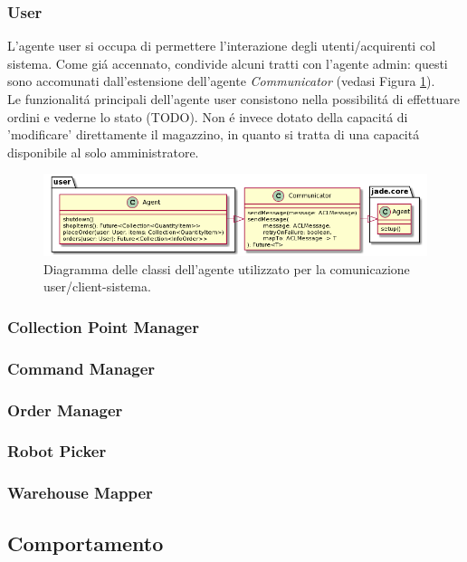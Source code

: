 \subsubsection{User}
L'agente user si occupa di permettere l'interazione degli utenti/acquirenti col sistema. Come gi\'a accennato, condivide alcuni tratti con l'agente admin: questi sono accomunati dall'estensione dell'agente \textit{Communicator} (vedasi Figura \ref{fig:class_diagram_user_agent}).\\
Le funzionalit\'a principali dell'agente user consistono nella possibilit\'a di effettuare ordini e vederne lo stato (TODO). Non \'e invece dotato della capacit\'a di 'modificare' direttamente il magazzino, in quanto si tratta di una capacit\'a disponibile al solo amministratore.
\begin{figure}[!ht]\centering
    \includegraphics[width=\textwidth]{section/design/figure/user/class_diagram.png}
    \caption{Diagramma delle classi dell'agente utilizzato per la comunicazione user/client-sistema.}
    \label{fig:class_diagram_user_agent}
\end{figure}

\subsubsection{Collection Point Manager}
\subsubsection{Command Manager}
\subsubsection{Order Manager}
\subsubsection{Robot Picker}
\subsubsection{Warehouse Mapper}

\subsection{Comportamento}

